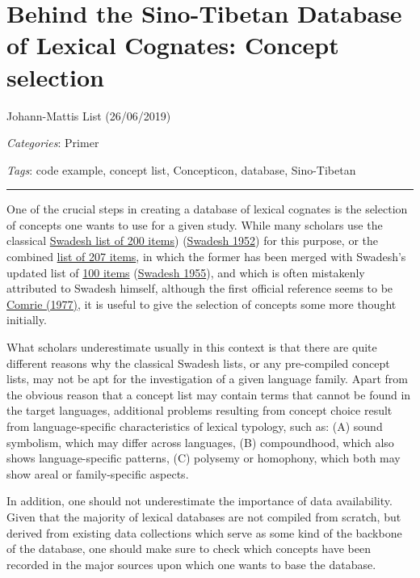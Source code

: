 \documentclass[
  a4paper,
  14pt,
  oneside,
  tablecaptionabove
]{scrbook}
\begin{document}
\newpage
\section*{Behind the Sino-Tibetan Database of Lexical Cognates: Concept
selection}

Johann-Mattis List (26/06/2019)

\emph{Categories}: Primer

\emph{Tags}: code example, concept list, Concepticon, database,
Sino-Tibetan

\begin{center}\rule{0.5\linewidth}{1pt}\end{center}

One of the crucial steps in creating a database of lexical cognates is
the selection of concepts one wants to use for a given study. While many
scholars use the classical
\href{https://concepticon.clld.org/contributions/Swadesh-1952-200}{Swadesh
list of 200 items}) (\href{http://bibliography.lingpy.org?key=Swadesh1952}{Swadesh 1952})
for this purpose, or the combined
\href{https://concepticon.clld.org/contributions/Comrie-1977-207}{list
of 207 items}, in which the former has been merged with Swadesh's
updated list of
\href{https://concepticon.clld.org/paramters/Swadesh-1955-100}{100
items} (\href{http://bibliography.lingpy.org?key=Swadesh1955}{Swadesh
1955}), and which is often mistakenly attributed to Swadesh himself,
although the first official reference seems to be
\href{http://bibliography.lingpy.org?key=Comrie1977}{Comrie (1977)}, it
is useful to give the selection of concepts some more thought initially.

What scholars underestimate usually in this context is that there are
quite different reasons why the classical Swadesh lists, or any
pre-compiled concept lists, may not be apt for the investigation of a
given language family. Apart from the obvious reason that a concept list
may contain terms that cannot be found in the target languages,
additional problems resulting from concept choice result from
language-specific characteristics of lexical typology, such as: (A)
sound symbolism, which may differ across languages, (B) compoundhood,
which also shows language-specific patterns, (C) polysemy or homophony,
which both may show areal or family-specific aspects.

In addition, one should not underestimate the importance of data
availability. Given that the majority of lexical databases are not
compiled from scratch, but derived from existing data collections which
serve as some kind of the backbone of the database, one should make sure
to check which concepts have been recorded in the major sources upon
which one wants to base the database.
\end{document}
